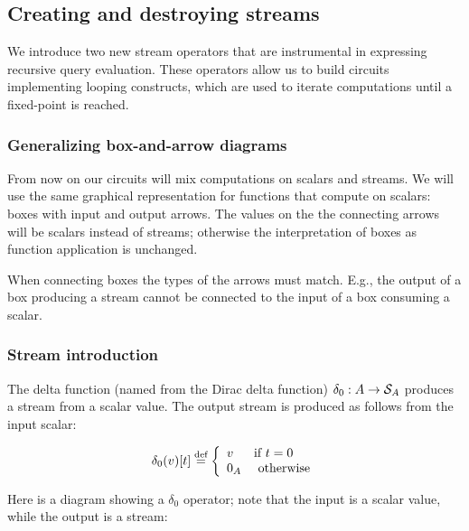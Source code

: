 \subsection{Creating and destroying streams}\label{sec:stream-intro-elim}

We introduce two new stream operators that are instrumental in
expressing recursive query evaluation.  These operators allow us
to build circuits implementing looping constructs, which 
are used to iterate computations until a fixed-point is reached.

\subsubsection{Generalizing box-and-arrow diagrams}

From now on our circuits will mix computations on scalars and streams.
We will use the same graphical representation for functions that compute
on scalars: boxes with input and output arrows.  The values on the
the connecting arrows will be scalars instead of streams; otherwise
the interpretation of boxes as function application is unchanged.

When connecting boxes the types of the arrows must match.  E.g.,
the output of a box producing a stream cannot be connected to the
input of a box consuming a scalar.

\subsubsection{Stream introduction}\label{sec:stream-introduction}

\begin{definition}
The delta function (named from the Dirac delta function) $\delta_0 : A \rightarrow \mathcal{S}_{A}$
produces a stream from a scalar value.  
The output stream is produced as follows from the input scalar:

$$\delta_0(v)[t] \stackrel{\textrm{\scriptsize def}}{=} \left\{
\begin{array}{ll}
  v & \mbox{if } t = 0 \\
  0_A & \mbox{ otherwise}
\end{array}
\right.
$$
\end{definition}

Here is a diagram showing a $\delta_0$ operator; note that the input is a scalar value,
while the output is a stream:  

\begin{center}
\end{center}

